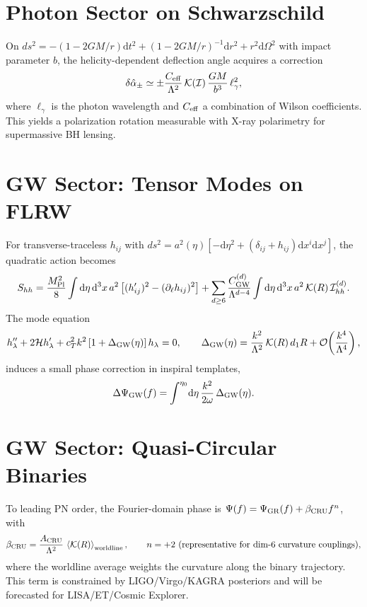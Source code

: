 \documentclass[12pt,a4paper,oneside]{scrbook}
\theoremstyle{definition}
\theoremstyle{remark}
\newcommand{\mpl}{M_{\mathrm{Pl}}}
\newcommand{\Order}{\mathcal{O}}
\newcommand{\dd}{\mathrm{d}}
\newcommand{\brak}[1]{\left\langle #1 \right\rangle}
\newcommand{\K}{\mathcal{K}}
\begin{document}
\section{Photon Sector on Schwarzschild}
\label{sec:photonSchw}
On $ds^2=-(1-2GM/r)\dd t^2+(1-2GM/r)^{-1}\dd r^2+r^2\dd\Omega^2$ with impact parameter $b$, the helicity-dependent deflection angle acquires a correction
\begin{equation}
\delta\hat{\alpha}_\pm \simeq \pm \frac{C_{\rm eff}}{\Lambda^2}\, \K(\mathcal{I})\, \frac{GM}{b^3}\, \ell_\gamma^2,
\end{equation}
where $\ell_\gamma$ is the photon wavelength and $C_{\rm eff}$ a combination of Wilson coefficients. This yields a polarization rotation measurable with X-ray polarimetry for supermassive BH lensing.
\section{GW Sector: Tensor Modes on FLRW}
\label{sec:GWFLRW}
For transverse-traceless $h_{ij}$ with $ds^2=a^2(\eta)\left[-\dd\eta^2+(\delta_{ij}+h_{ij})\dd x^i\dd x^j\right]$, the quadratic action becomes
\begin{equation}
S_{hh}=\frac{\mpl^2}{8}\int \dd\eta\,\dd^3x\, a^2\left[(h_{ij}')^2-(\partial_\ell h_{ij})^2\right]
+ \sum_{d\ge 6}\frac{C^{(d)}_{\rm GW}}{\Lambda^{d-4}}\int \dd\eta\,\dd^3x\, a^2\, \K(R)\, \mathcal{I}^{(d)}_{hh}.
\end{equation}
The mode equation
\begin{equation}
h_\lambda''+2\mathcal{H}h_\lambda'+ c_T^2 k^2\left[1+\Delta_{\rm GW}(\eta)\right] h_\lambda=0,\qquad
\Delta_{\rm GW}(\eta)= \frac{k^2}{\Lambda^2}\,\K(R)\, d_1 R + \Order\!\left(\frac{k^4}{\Lambda^4}\right),
\label{eq:gw-eq}
\end{equation}
induces a small phase correction in inspiral templates,
\begin{equation}
\Delta\Psi_{\rm GW}(f)= \int^{\eta_0}\!\dd\eta\, \frac{k^2}{2\omega}\,\Delta_{\rm GW}(\eta).
\end{equation}
\section{GW Sector: Quasi-Circular Binaries}
\label{sec:GWinspiral}
To leading PN order, the Fourier-domain phase is $\Psi(f)= \Psi_{\rm GR}(f)+ \beta_{\rm CRU} f^{n}$, with
\begin{equation}
\beta_{\rm CRU} = \frac{A_{\rm CRU}}{\Lambda^2}\,\brak{\K(R)}_{\rm worldline},\qquad n=+2 \ \text{(representative for dim-6 curvature couplings)},
\end{equation}
where the worldline average weights the curvature along the binary trajectory. This term is constrained by LIGO/Virgo/KAGRA posteriors and will be forecasted for LISA/ET/Cosmic Explorer.
\end{document}
